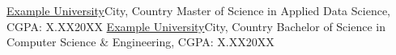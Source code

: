   \customSubHeadingContentStart
    \customSubHeading
      {\href{https://www.example.edu/}{Example University}}{City, Country}
    \customRoleHeading
      {Master of Science in Applied Data Science, CGPA: X.XX}{20XX}
    \vspace{-10pt}
    \customSubHeading
      {\href{https://www.example.edu/}{Example University}}{City, Country}
    \customRoleHeading
      {Bachelor of Science in Computer Science \& Engineering, CGPA: X.XX}{20XX}
  \customSubHeadingContentEnd
\vspace{-8pt}